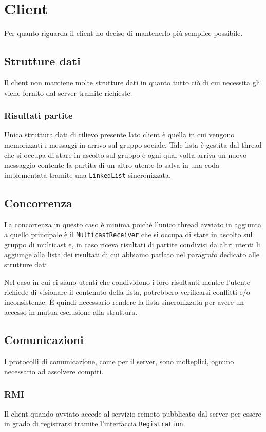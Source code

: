 \section{Client}
Per quanto riguarda il client ho deciso di mantenerlo più semplice possibile.

\subsection{Strutture dati}
Il client non mantiene molte strutture dati in quanto tutto ciò di cui necessita gli viene fornito
dal server tramite richieste.

\subsubsection{Risultati partite}
Unica struttura dati di rilievo presente lato client è quella in cui vengono memorizzati i
messaggi in arrivo sul gruppo sociale. Tale lista è gestita dal thread che si occupa di stare in
ascolto sul gruppo e ogni qual volta arriva un nuovo messaggio contente la partita di un altro
utente lo salva in una coda implementata tramite una \verb|LinkedList| sincronizzata.

\subsection{Concorrenza}
La concorrenza in questo caso è minima poiché l'unico thread avviato in aggiunta a quello
principale è il \verb|MulticastReceiver| che si occupa di stare in ascolto sul gruppo di multicast
e, in caso riceva risultati di partite condivisi da altri utenti li aggiunge alla lista dei
risultati di cui abbiamo parlato nel paragrafo dedicato alle strutture dati.

Nel caso in cui ci siano utenti che condividono i loro risultanti mentre l'utente richiede di
visionare il contenuto della lista, potrebbero verificarsi conflitti e/o inconsistenze. \`E quindi
necessario rendere la lista sincronizzata per avere un accesso in mutua esclusione alla struttura.

\subsection{Comunicazioni}
I protocolli di comunicazione, come per il server, sono molteplici, ognuno necessario ad assolvere
compiti.

\subsubsection{RMI}
Il client quando avviato accede al servizio remoto pubblicato dal server per essere in grado di
registrarsi tramite l'interfaccia \verb|Registration|.

